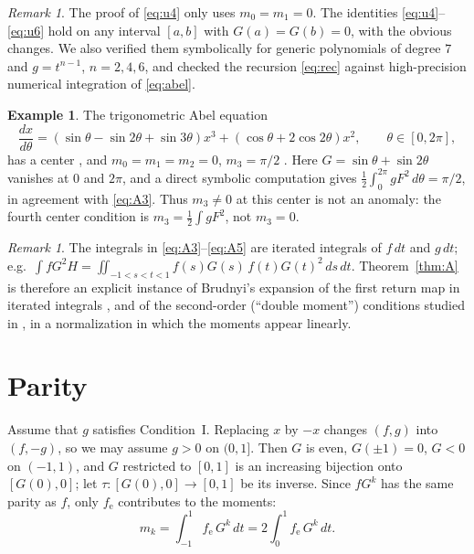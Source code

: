 \documentclass[11pt]{amsart}
\numberwithin{equation}{section}
\theoremstyle{plain}
\theoremstyle{definition}
\newtheorem{example}[theorem]{Example}
\theoremstyle{remark}
\newtheorem{remark}[theorem]{Remark}
\newcommand{\fe}{f_{\mathrm e}}
\begin{document}
\begin{remark}
The proof of \eqref{eq:u4} only uses $m_0=m_1=0$. The identities
\eqref{eq:u4}--\eqref{eq:u6} hold on any interval $[a,b]$ with $G(a)=G(b)=0$, with
the obvious changes. We also verified them symbolically for generic polynomials
of degree $7$ and $g=t^{n-1}$, $n=2,4,6$, and checked the recursion
\eqref{eq:rec} against high-precision numerical integration of \eqref{eq:abel}.
\end{remark}

\begin{example}\label{ex:GGS}
The trigonometric Abel equation
\[
 \frac{dx}{d\theta}=(\sin\theta-\sin2\theta+\sin3\theta)x^3+(\cos\theta+2\cos2\theta)x^2,
 \qquad\theta\in[0,2\pi],
\]
has a center \cite{GGS14}, and $m_0=m_1=m_2=0$, $m_3=\pi/2$ \cite[Rem.~1.8]{ALA20}.
Here $G=\sin\theta+\sin2\theta$ vanishes at $0$ and $2\pi$, and a direct symbolic
computation gives $\frac12\int_0^{2\pi}gF^2\,d\theta=\pi/2$, in agreement with
\eqref{eq:A3}. Thus $m_3\ne0$ at this center is not an anomaly: the fourth center
condition is $m_3=\frac12\int gF^2$, not $m_3=0$.
\end{example}

\begin{remark}
The integrals in \eqref{eq:A3}--\eqref{eq:A5} are iterated integrals of $f\,dt$ and
$g\,dt$; e.g.\ $\int fG^2H=\iint_{-1<s<t<1}f(s)G(s)\,f(t)G(t)^2\,ds\,dt$. Theorem~\ref{thm:A}
is therefore an explicit instance of Brudnyi's expansion of the first return map in
iterated integrals \cite{Bru06}, and of the second-order (``double moment'')
conditions studied in \cite{CGM13a,BPY16}, in a normalization in which the moments
appear linearly.
\end{remark}

\section{Parity}\label{sec:parity}

Assume that $g$ satisfies Condition~I. Replacing $x$ by $-x$ changes $(f,g)$ into
$(f,-g)$, so we may assume $g>0$ on $(0,1]$. Then $G$ is even, $G(\pm1)=0$,
$G<0$ on $(-1,1)$, and $G$ restricted to $[0,1]$ is an increasing bijection onto
$[G(0),0]$; let $\tau:[G(0),0]\to[0,1]$ be its inverse. Since $fG^k$ has the
same parity as $f$, only $\fe$ contributes to the moments:
\begin{equation}\label{eq:mkeven}
 m_k=\int_{-1}^1\fe\,G^k\,dt=2\int_0^1\fe\,G^k\,dt .
\end{equation}
\end{document}
